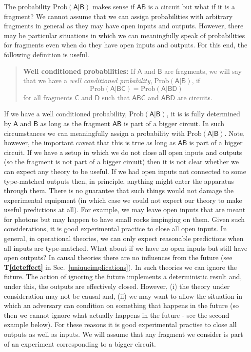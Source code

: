 \documentclass[10pt]{article}
\begin{document}
The probability $\text{Prob}(\mathsf{A|B})$ makes sense if $\mathsf{AB}$ is a circuit but what if it is a fragment?  We cannot assume that we can assign probabilities with arbitrary fragments in general as they may have open inputs and outputs. However, there may be particular situations in which we can meaningfully speak of probabilities for fragments even when do they have open inputs and outputs.  For this end, the following definition is useful.
\begin{quote}
{\bf Well conditioned probabilities:} If $\mathsf A$ and $\mathsf B$ are fragments, we will say that we have a \emph{well conditioned probability}, $\text{Prob}\mathsf{(A|B)}$, if
\begin{equation}
\text{Prob}\mathsf{(A|BC)} = \text{Prob}\mathsf{(A|BD)}
\end{equation}
for all fragments $\mathsf C$ and $\mathsf D$ such that $\mathsf{ABC}$ and $\mathsf{ABD}$ are circuits.
\end{quote}
If we have a well conditioned probability, $\text{Prob}\mathsf{(A|B)}$, it is is fully determined by $\mathsf{A}$ and $\mathsf{B}$ as long as the fragment $\mathsf{AB}$ is part of a bigger circuit.  In such circumstances we can meaningfully assign a probability with $\text{Prob}\mathsf{(A|B)}$.  Note, however, the important caveat that this is true as long as $\mathsf{AB}$ is part of a bigger circuit.   If we have a setup in which we do not close all open inputs and outputs (so the fragment is not part of a bigger circuit) then it is not clear whether we can expect any theory to be useful.     If we had open inputs not connected to some type-matched outputs then, in principle, anything might enter the apparatus through them.  There is no guarantee that such things would not damage the experimental equipment (in which case we could not expect our theory to make useful predictions at all).  For example, we may leave open inputs that are meant for photons but may happen to have small rocks impinging on them.  Given such considerations, it is good experimental practice to close all open inputs.  In general, in operational theories, we can only expect reasonable predictions when all inputs are type-matched.  What about if we have no open inputs but still have open outputs? In causal theories there are no influences from the future (see {\bf T\ref{deteffect}} in Sec.\ \ref{uniqueimplications}).  In such theories we can ignore the future.  The action of ignoring the future implements a deterministic result and, under this, the outputs are effectively closed.  However, (i) the theory under consideration may not be causal and, (ii) we may want to allow the situation in which an adversary can condition on something that happens in the future (so then we cannot ignore what actually happens in the future - see the second example below).  For these reasons it is good experimental practise to close all outputs as well as inputs.  We will assume that any fragment we consider is part of an experiment corresponding to a bigger circuit.
\end{document}
